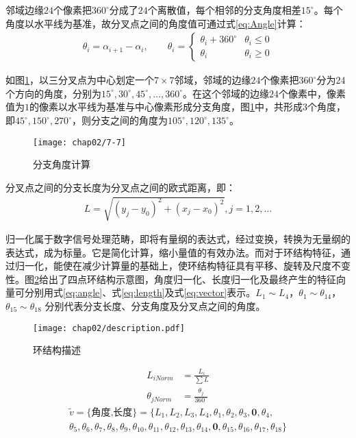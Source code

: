 邻域边缘$24$个像素把$360^{\circ}$分成了$24$个离散值，每个相邻的分支角度相差$15^{\circ}$。每个角度以水平线为基准，故分叉点之间的角度值可通过式\ref{eq:Angle}计算：
\begin{align}
\theta_i = \alpha_{i+1} - \alpha_i, \qquad
\theta_i = \left\{ \begin{array}{ll}
\theta_i + 360^{\circ} & \theta_i \le 0 \\
\theta_i & \theta_i \geq 0
\end{array} \right.
\label{eq:Angle}
\end{align}

如图\ref{fig:calculate-angles}，以三分叉点为中心划定一个$7\times7$邻域，邻域的边缘$24$个像素把$360^{\circ}$分为$24$个方向的角度，分别为$15^{\circ}, 30^{\circ},45^{\circ}, \ldots, 360^{\circ}$。在这个邻域的边缘$24$个像素中，像素值为$1$的像素以水平线为基准与中心像素形成分支角度，图\ref{fig:calculate-angles}中，共形成$3$个角度，即$45^{\circ}, 150^{\circ},270^{\circ}$，则分支之间的角度为$105^{\circ}, 120^{\circ}, 135^{\circ}$。

\begin{figure}[H]
\centering
\texttt{[image: chap02/7-7]}
\caption{分支角度计算}
\label{fig:calculate-angles}
\end{figure}

分叉点之间的分支长度为分叉点之间的欧式距离，即：
\begin{align}
L = \sqrt{(y_j - y_0)^2 + (x_j - x_0)^2}, j = 1, 2, \ldots
\end{align}

归一化属于数字信号处理范畴，即将有量纲的表达式，经过变换，转换为无量纲的表达式，成为标量。它是简化计算，缩小量值的有效办法。而对于环结构特征，通过归一化，能使在减少计算量的基础上，使环结构特征具有平移、旋转及尺度不变性。图\ref{fig:description}给出了四点环结构示意图，角度归一化、长度归一化及最终产生的特征向量可分别用式\ref{eq:angle}、式\ref{eq:length}及式\ref{eq:vector}表示。$L_{1} \sim L_{4}$，$\theta_{1} \sim \theta_{14}$，$\theta_{15} \sim \theta_{18}$ 分别代表分支长度、分支角度及分叉点之间的角度。

\begin{figure}[H]
\centering
\texttt{[image: chap02/description.pdf]}
\caption{环结构描述}
\label{fig:description}
\end{figure}
\begin{align}
L_{iNorm}&=\frac{L_i}{\sum{L}}\label{eq:length}\\
\theta_{jNorm}&=\frac{\theta_j}{360^\circ}\label{eq:angle}
\end{align}
\begin{multline}
\tilde{v}=\{\textrm{角度,长度}\}=\{L_{1},L_{2},L_{3},L_{4},\theta_{1},\theta_{2},\theta_{3},\mathbf{0},\theta_{4},\\\theta_{5},\theta_{6},\theta_{7},\theta_{8},\theta_{9},\theta_{10},\theta_{11},\theta_{12},\theta_{13},\theta_{14},\mathbf{0},\theta_{15},\theta_{16},\theta_{17},\theta_{18}\}
\label{eq:vector}
\end{multline}


